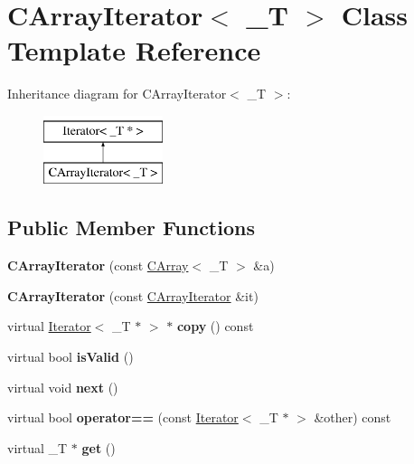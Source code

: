 \hypertarget{class_c_array_iterator}{
\section{CArrayIterator$<$ \_\-T $>$ Class Template Reference}
\label{class_c_array_iterator}
}
Inheritance diagram for CArrayIterator$<$ \_\-T $>$:\begin{figure}[H]
\begin{center}
\leavevmode
\includegraphics[height=2cm]{class_c_array_iterator}
\end{center}
\end{figure}
\subsection*{Public Member Functions}
\begin{DoxyCompactItemize}
\item 
\hypertarget{class_c_array_iterator_a27cc6509cd5613c37b7546b78907cd19}{
{\bfseries CArrayIterator} (const \hyperlink{struct_c_array}{CArray}$<$ \_\-T $>$ \&a)}
\label{class_c_array_iterator_a27cc6509cd5613c37b7546b78907cd19}

\item 
\hypertarget{class_c_array_iterator_a800cbe619ff42b3f8e9e1d435c2b2054}{
{\bfseries CArrayIterator} (const \hyperlink{class_c_array_iterator}{CArrayIterator} \&it)}
\label{class_c_array_iterator_a800cbe619ff42b3f8e9e1d435c2b2054}

\item 
\hypertarget{class_c_array_iterator_a2d9ad630ffa8bc46370a3b3910063128}{
virtual \hyperlink{class_iterator}{Iterator}$<$ \_\-T $\ast$ $>$ $\ast$ {\bfseries copy} () const }
\label{class_c_array_iterator_a2d9ad630ffa8bc46370a3b3910063128}

\item 
\hypertarget{class_c_array_iterator_a33b0f0ff28b445976a7835035a2b3d3f}{
virtual bool {\bfseries isValid} ()}
\label{class_c_array_iterator_a33b0f0ff28b445976a7835035a2b3d3f}

\item 
\hypertarget{class_c_array_iterator_a62c6867f13228ed5a51c18b07f99029f}{
virtual void {\bfseries next} ()}
\label{class_c_array_iterator_a62c6867f13228ed5a51c18b07f99029f}

\item 
\hypertarget{class_c_array_iterator_a3a71709f663d0aaf86aac7063149495f}{
virtual bool {\bfseries operator==} (const \hyperlink{class_iterator}{Iterator}$<$ \_\-T $\ast$ $>$ \&other) const }
\label{class_c_array_iterator_a3a71709f663d0aaf86aac7063149495f}

\item 
\hypertarget{class_c_array_iterator_a3256fa102bc458bc7127d6b70ccdb4cc}{
virtual \_\-T $\ast$ {\bfseries get} ()}
\label{class_c_array_iterator_a3256fa102bc458bc7127d6b70ccdb4cc}

\end{DoxyCompactItemize}
